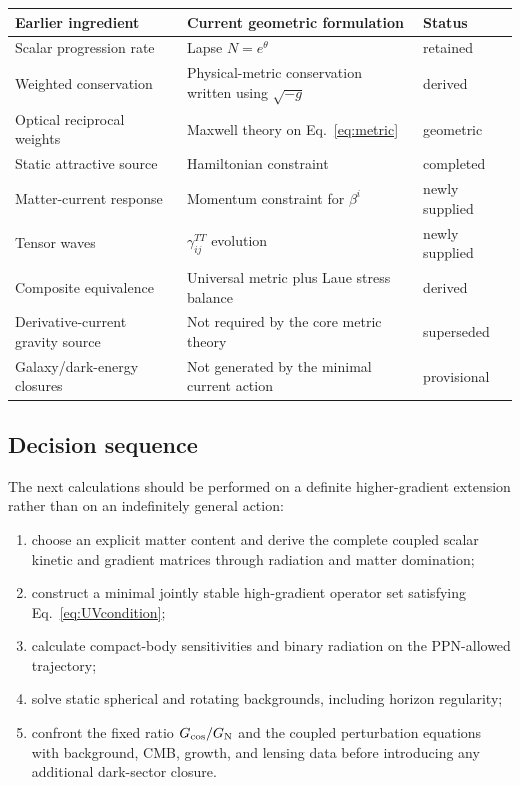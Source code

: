 \documentclass[11pt]{article}
\newcommand{\GN}{G_{\rm N}}
\newcommand{\Gc}{G_{\rm cos}}
\begin{document}
\begin{center}
\begin{tabular}{@{}p{}p{}p{}@{}}
\toprule
Earlier ingredient & Current geometric formulation & Status \\
\midrule
Scalar progression rate & Lapse $N=e^\theta$ & retained \\
Weighted conservation & Physical-metric conservation written using $\sqrt{-g}$ & derived \\
Optical reciprocal weights & Maxwell theory on Eq.~\eqref{eq:metric} & geometric \\
Static attractive source & Hamiltonian constraint & completed \\
Matter-current response & Momentum constraint for $\beta^i$ & newly supplied \\
Tensor waves & $\gamma_{ij}^{TT}$ evolution & newly supplied \\
Composite equivalence & Universal metric plus Laue stress balance & derived \\
Derivative-current gravity source & Not required by the core metric theory & superseded \\
Galaxy/dark-energy closures & Not generated by the minimal current action & provisional \\
\bottomrule
\end{tabular}
\end{center}

\subsection{Decision sequence}

The next calculations should be performed on a definite higher-gradient extension rather than on an indefinitely general action:
\begin{enumerate}[label=(\arabic*)]
\item choose an explicit matter content and derive the complete coupled scalar kinetic and gradient matrices through radiation and matter domination;
\item construct a minimal jointly stable high-gradient operator set satisfying Eq.~\eqref{eq:UVcondition};
\item calculate compact-body sensitivities and binary radiation on the PPN-allowed trajectory;
\item solve static spherical and rotating backgrounds, including horizon regularity;
\item confront the fixed ratio $\Gc/\GN$ and the coupled perturbation equations with background, CMB, growth, and lensing data before introducing any additional dark-sector closure.
\end{enumerate}
\end{document}
